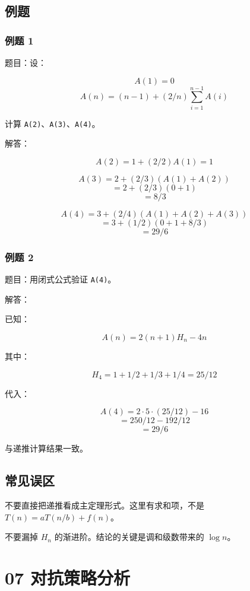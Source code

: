 \documentclass[UTF8,zihao=-4]{ctexart}
\begin{document}
\subsection*{例题}

\subsubsection*{例题 1}

题目：设：

\[A(1) = 0\]
\[A(n) = (n - 1) + (2/n) \sum_{i=1}^{n-1} A(i)\]

计算 \texttt{A(2)}、\texttt{A(3)}、\texttt{A(4)}。

解答：

\[A(2) = 1 + (2/2)A(1) = 1\]

\[A(3) = 2 + (2/3)(A(1) + A(2))\]
\[= 2 + (2/3)(0 + 1)\]
\[= 8/3\]

\[A(4) = 3 + (2/4)(A(1) + A(2) + A(3))\]
\[= 3 + (1/2)(0 + 1 + 8/3)\]
\[= 29/6\]

\subsubsection*{例题 2}

题目：用闭式公式验证 \texttt{A(4)}。

解答：

已知：

\[A(n) = 2(n + 1)H_{n} - 4n\]

其中：

\[H_{4} = 1 + 1/2 + 1/3 + 1/4 = 25/12\]

代入：

\[A(4) = 2\cdot 5\cdot (25/12) - 16\]
\[= 250/12 - 192/12\]
\[= 29/6\]

与递推计算结果一致。

\subsection*{常见误区}

不要直接把递推看成主定理形式。这里有求和项，不是 $T(n) = aT(n/b) + f(n)$。

不要漏掉 $H_n$ 的渐进阶。结论的关键是调和级数带来的 $\log n$。

\newpage

\section*{07 对抗策略分析}
\end{document}
